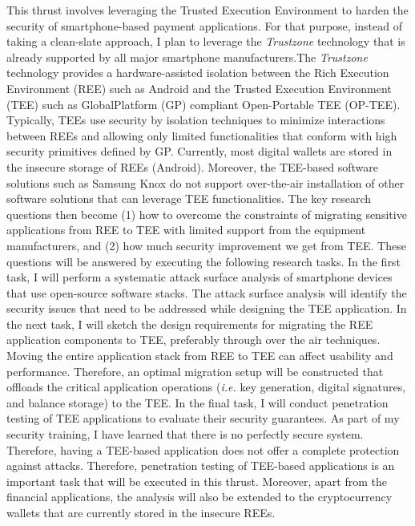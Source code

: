 \documentclass{NSF}
\newcommand{\ie}{{\em i.e.}\xspace}
\begin{document}
This thrust involves leveraging the Trusted Execution Environment to harden the security of smartphone-based payment applications. For that purpose, instead of taking a clean-slate approach, I plan to leverage the {\em Trustzone} technology that is already supported by all major smartphone manufacturers.The {\em Trustzone} technology provides a hardware-assisted isolation between the Rich Execution Environment (REE) such as Android and the Trusted Execution Environment (TEE) such as GlobalPlatform (GP) compliant Open-Portable TEE (OP-TEE). Typically, TEEs use security by isolation techniques to minimize interactions between REEs and allowing only limited functionalities that conform with high security primitives defined by GP. Currently, most digital wallets are stored in the insecure storage of REEs (Android). Moreover, the TEE-based software solutions such as Samsung Knox do not support over-the-air installation of other software solutions that can leverage TEE functionalities. The key research questions then become (1) how to overcome the constraints of migrating sensitive applications from REE to TEE with limited support from the equipment manufacturers, and (2) how much security improvement we get from TEE. These questions will be answered by executing the following research tasks. In the first task, I will perform a systematic attack surface analysis of smartphone devices that use open-source software stacks. The attack surface analysis will identify the security issues that need to be addressed while designing the TEE application. In the next task, I will sketch the design requirements for migrating the REE application components to TEE, preferably through over the air techniques. Moving the entire application stack from REE to TEE can affect usability and performance. Therefore, an optimal migration setup will be constructed that offloads the critical application operations (\ie key generation, digital signatures, and balance storage) to the TEE. In the final task, I will conduct penetration testing of TEE applications to evaluate their security guarantees. As part of my security training, I have learned that there is no perfectly secure system. Therefore, having a TEE-based application does not offer a complete protection against attacks. Therefore, penetration testing of TEE-based applications is an important task that will be executed in this thrust. Moreover, apart from the financial applications, the analysis will also be extended to the cryptocurrency wallets that are currently stored in the insecure REEs. 
\end{document}
